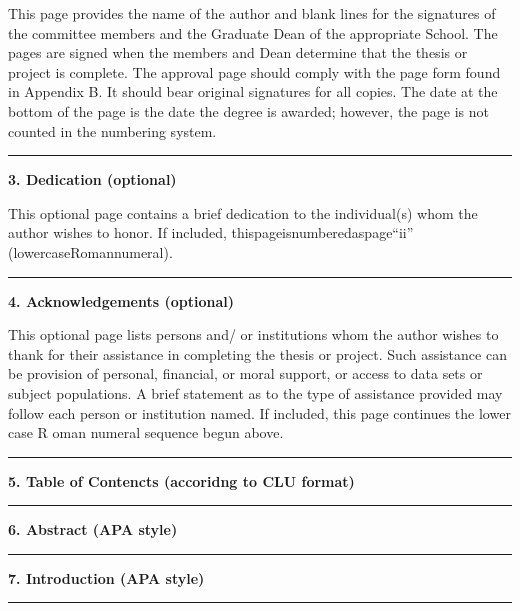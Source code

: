 \documentclass[openany]{book}
\begin{document}
This page provides the name of the author and blank lines for the signatures of the committee members and the Graduate Dean of the appropriate School. The pages are signed when the members and Dean determine that the thesis or project is complete. The approval page should comply with the page form found in Appendix B. It should bear original signatures for all copies. The date at the bottom of the page is the date the degree is awarded; however, the page is not counted in the numbering system.

\begin{center}\rule{0.5\linewidth}{0.5pt}\end{center}

\textbf{3. Dedication (optional)}

This optional page contains a brief dedication to the individual(s) whom the author wishes to honor. If included, thispageisnumberedaspage``ii'' (lowercaseRomannumeral).

\begin{center}\rule{0.5\linewidth}{0.5pt}\end{center}

\textbf{4. Acknowledgements (optional)}

This optional page lists persons and/ or institutions whom the author wishes to thank for their assistance in completing the thesis or project. Such assistance can be provision of personal, financial, or moral support, or access to data sets or subject populations. A brief statement as to the type of assistance provided may follow each person or institution named. If included, this page continues the lower case R oman numeral sequence begun above.

\begin{center}\rule{0.5\linewidth}{0.5pt}\end{center}

\textbf{5. Table of Contencts (accoridng to CLU format)}

\begin{center}\rule{0.5\linewidth}{0.5pt}\end{center}

\textbf{6. Abstract (APA style)}

\begin{center}\rule{0.5\linewidth}{0.5pt}\end{center}

\textbf{7. Introduction (APA style)}

\begin{center}\rule{0.5\linewidth}{0.5pt}\end{center}
\end{document}
